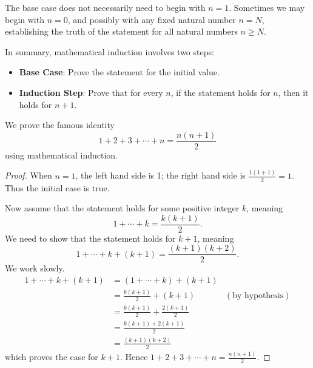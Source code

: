 The base case does not necessarily need to begin with $n = 1$. Sometimes we may begin with $n = 0$, and possibly with any fixed natural number $n = N$, establishing the truth of the statement for all natural numbers $n \geq N$.

In summary, mathematical induction involves two steps:
\begin{itemize}
    \item \textbf{Base Case}: Prove the statement for the initial value.
    \item \textbf{Induction Step}: Prove that for every $n$, if the statement holds for $n$, then it holds for $n + 1$.
\end{itemize}

\begin{example}
    We prove the famous identity
    \[
        1 + 2 + 3 + \cdots + n = \frac{n(n+1)}2
    \]
    using mathematical induction.
    \begin{proof}
        When $n = 1$, the left hand side is 1; the right hand side is $\frac{1(1+1)}{2} = 1$. Thus the initial case is true.

        Now assume that the statement holds for some positive integer $k$, meaning
        \[
            1 + \cdots + k = \frac{k(k+1)}2.
        \]
        We need to show that the statement holds for $k+1$, meaning
        \[
            1 + \cdots + k + (k+1) = \frac{(k+1)(k+2)}2.
        \]
        We work slowly.
        \begin{align*}
            1 + \cdots + k + (k+1) &= (1 + \cdots + k) + (k+1)\\
            &= \frac{k(k+1)}{2} + (k+1) & (\text{by hypothesis})\\
            &= \frac{k(k+1)}2 + \frac{2(k+1)}{2}\\
            &= \frac{k(k+1) + 2(k+1)}2\\
            &= \frac{(k+1)(k+2)}2
        \end{align*}
        which proves the case for $k + 1$. Hence $1 + 2 + 3 + \cdots + n = \frac{n(n+1)}2$.
    \end{proof}
\end{example}

